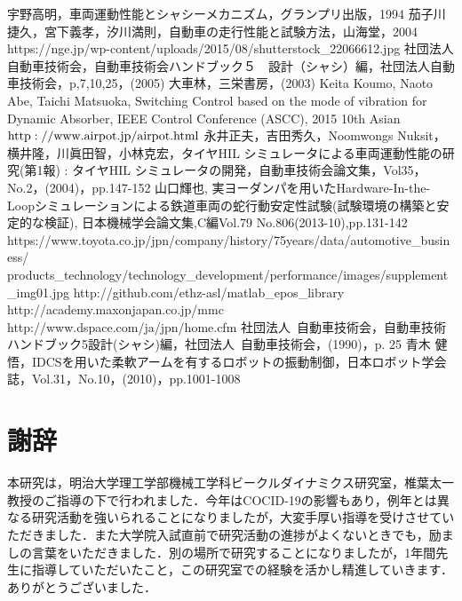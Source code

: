 \documentclass[a4paper,12pt]{article_vdlab_sotsuron}
\begin{document}
\newpage
\begin{thebibliography}{99}
宇野高明，車両運動性能とシャシーメカニズム，グランプリ出版，1994
茄子川捷久，宮下義孝，汐川満則，自動車の走行性能と試験方法，山海堂，2004
https://nge.jp/wp-content/uploads/2015/08/shutterstock\_22066612.jpg
社団法人自動車技術会，自動車技術会ハンドブック５　設計（シャシ）編，社団法人自動車技術会，p,7,10,25，(2005)
大車林，三栄書房，(2003)
Keita Koumo, Naoto Abe, Taichi Matsuoka, Switching Control based on the mode of vibration for Dynamic Absorber, IEEE Control Conference (ASCC), 2015 10th Asian
$\rm{http://www.airpot.jp/airpot.html}$
永井正夫，吉田秀久，Noomwongs Nuksit，横井隆，川眞田智，小林克宏，タイヤHIL シミュレータによる車両運動性能の研究(第1報) : タイヤHIL シミュレータの開発，自動車技術会論文集，Vol35，No.2，(2004)，pp.147-152
山口輝也, 実ヨーダンパを用いたHardware-In-the-Loopシミュレーションによる鉄道車両の蛇行動安定性試験(試験環境の構築と安定的な検証), 日本機械学会論文集,C編Vol.79 No.806(2013-10),pp.131-142
https://www.toyota.co.jp/jpn/company/history/75years/data/automotive\_business/ \\ products\_technology/technology\_development/performance/images/supplement\_img01.jpg
http://github.com/ethz-asl/matlab\_epos\_library
http://academy.maxonjapan.co.jp/mmc
http://www.dspace.com/ja/jpn/home.cfm
社団法人\ 自動車技術会，自動車技術ハンドブック5設計(シャシ)編，社団法人\ 自動車技術会，(1990)，p. 25
青木 健悟，IDCSを用いた柔軟アームを有するロボットの振動制御，日本ロボット学会誌，Vol.31，No.10，(2010)，pp.1001-1008
\end{thebibliography}

\newpage
\section*{謝辞}
本研究は，明治大学理工学部機械工学科ビークルダイナミクス研究室，椎葉太一教授のご指導の下で行われました．今年はCOCID-19の影響もあり，例年とは異なる研究活動を強いられることになりましたが，大変手厚い指導を受けさせていただきました．また大学院入試直前で研究活動の進捗がよくないときでも，励ましの言葉をいただきました．別の場所で研究することになりましたが，1年間先生に指導していただいたこと，この研究室での経験を活かし精進していきます．ありがとうございました．
\end{document}
